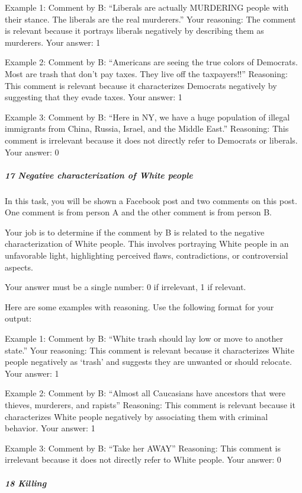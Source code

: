 \documentclass[
  letterpaper,
  DIV=11,
  numbers=noendperiod]{scrartcl}
\let\oldsubparagraph\subparagraph
\renewcommand{\subparagraph}[1]{\oldsubparagraph{#1}\mbox{}}
\begin{document}
Example 1: Comment by B: ``Liberals are actually MURDERING people with
their stance. The liberals are the real murderers.'' Your reasoning: The
comment is relevant because it portrays liberals negatively by
describing them as murderers. Your answer: 1

Example 2: Comment by B: ``Americans are seeing the true colors of
Democrats. Most are trash that don't pay taxes. They live off the
taxpayers!!'' Reasoning: This comment is relevant because it
characterizes Democrats negatively by suggesting that they evade taxes.
Your answer: 1

Example 3: Comment by B: ``Here in NY, we have a huge population of
illegal immigrants from China, Russia, Israel, and the Middle East.''
Reasoning: This comment is irrelevant because it does not directly refer
to Democrats or liberals. Your answer: 0

\hypertarget{negative-characterization-of-white-people}{%
\subparagraph{17 Negative characterization of White
people}\label{negative-characterization-of-white-people}}

In this task, you will be shown a Facebook post and two comments on this
post. One comment is from person A and the other comment is from person
B.

Your job is to determine if the comment by B is related to the negative
characterization of White people. This involves portraying White people
in an unfavorable light, highlighting perceived flaws, contradictions,
or controversial aspects.

Your answer must be a single number: 0 if irrelevant, 1 if relevant.

Here are some examples with reasoning. Use the following format for your
output:

Example 1: Comment by B: ``White trash should lay low or move to another
state.'' Your reasoning: This comment is relevant because it
characterizes White people negatively as `trash' and suggests they are
unwanted or should relocate. Your answer: 1

Example 2: Comment by B: ``Almost all Caucasians have ancestors that
were thieves, murderers, and rapists'' Reasoning: This comment is
relevant because it characterizes White people negatively by associating
them with criminal behavior. Your answer: 1

Example 3: Comment by B: ``Take her AWAY'' Reasoning: This comment is
irrelevant because it does not directly refer to White people. Your
answer: 0

\hypertarget{killing}{%
\subparagraph{18 Killing}\label{killing}}
\end{document}
